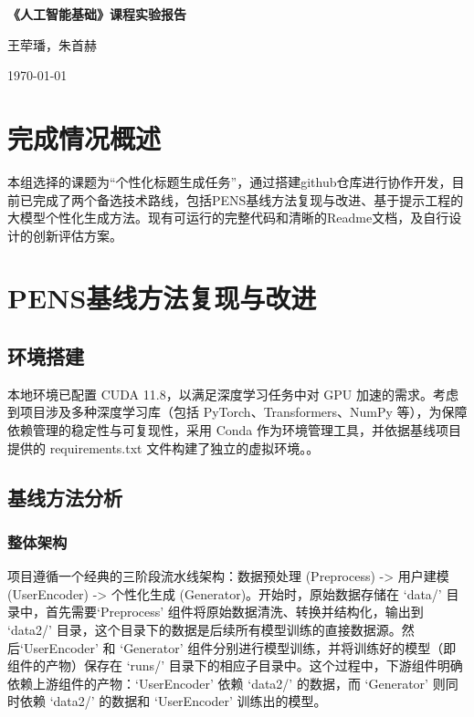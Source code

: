 \documentclass[10pt,a4paper]{article}
\begin{document}
\begin{center}
    \LARGE{\textbf{《人工智能基础》课程实验报告}}
    
    \vspace{0.5cm}
    \large{王荦璠，朱首赫}
    
    \vspace{0.3cm}
    \today
\end{center}

\section{完成情况概述}
本组选择的课题为“个性化标题生成任务”，通过搭建github仓库进行协作开发，目前已完成了两个备选技术路线，包括PENS基线方法复现与改进、基于提示工程的大模型个性化生成方法。现有可运行的完整代码和清晰的Readme文档，及自行设计的创新评估方案。

\section{PENS基线方法复现与改进}
\subsection{环境搭建}
本地环境已配置 CUDA 11.8，以满足深度学习任务中对 GPU 加速的需求。考虑到项目涉及多种深度学习库（包括 PyTorch、Transformers、NumPy 等），为保障依赖管理的稳定性与可复现性，采用 Conda 作为环境管理工具，并依据基线项目提供的 requirements.txt 文件构建了独立的虚拟环境。。

\subsection{基线方法分析}
\subsubsection{整体架构}
项目遵循一个经典的三阶段流水线架构：数据预处理 (Preprocess) -> 用户建模 (UserEncoder) -> 个性化生成 (Generator)。开始时，原始数据存储在 ‘data/’ 目录中，首先需要‘Preprocess’ 组件将原始数据清洗、转换并结构化，输出到 ‘data2/’ 目录，这个目录下的数据是后续所有模型训练的直接数据源。然后‘UserEncoder’ 和 ‘Generator’ 组件分别进行模型训练，并将训练好的模型（即组件的产物）保存在 ‘runs/’ 目录下的相应子目录中。这个过程中，下游组件明确依赖上游组件的产物：‘UserEncoder’ 依赖 ‘data2/’ 的数据，而 ‘Generator’ 则同时依赖 ‘data2/’ 的数据和 ‘UserEncoder’ 训练出的模型。
\end{document}
